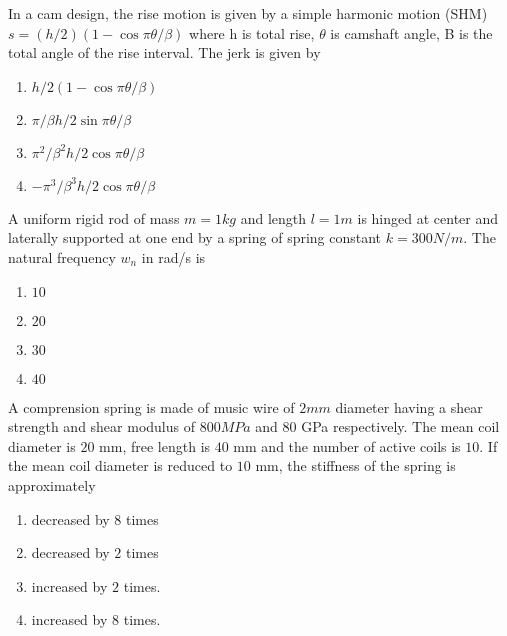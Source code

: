     \item In  a cam design, the rise motion is given by a simple harmonic motion (SHM) \\$s=(h/2)(1-\cos{\pi\theta/\beta})$ where h is total rise, $\theta$ is camshaft angle, B is the total angle of the rise interval. The jerk is given by
    \begin{multicols}{2}
    \begin{enumerate}
        \item $h/2(1-\cos{\pi\theta/\beta})$
        \item $\pi/\beta h/2 \sin{\pi\theta/\beta}$
        \item $\pi^2/\beta^2 h/2 \cos{\pi\theta/\beta}$
        \item $-\pi^3/\beta^3 h/2 \cos{\pi\theta/\beta}$
    \end{enumerate}
    \end{multicols}
    \item A uniform rigid rod of mass $m=1kg$ and length $l= 1m$ is hinged at center and laterally supported at one end by a spring of spring constant $k = 300N/m$. The natural frequency $w_n$ in rad/s is 
    \begin{multicols}{4}
    \begin{enumerate}
        \item $10$
        \item $20$
        \item $30$
        \item $40$
    \end{enumerate}
    \end{multicols}
    \item A comprension spring is made of music wire of $2 mm$ diameter having a shear strength and shear modulus of $800 MPa$ and $80$ GPa respectively. The mean coil diameter is $20$ mm, free length is $40$ mm and the number of active coils is $10$. If the mean coil diameter is reduced to $10$ mm, the stiffness of the spring is approximately
    \begin{multicols}{4}
    \begin{enumerate}
        \item decreased by $8$ times
        \item decreased by $2$ times
        \item increased by $2$ times.
        \item increased by $8$ times.
    \end{enumerate}
    \end{multicols}

